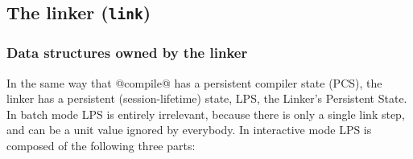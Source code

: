 \documentclass[11pt]{article}
\begin{document}
\subsection{The linker (\mbox{\tt link})}
\label{sec:linker}

\subsubsection{Data structures owned by the linker}

In the same way that @compile@ has a persistent compiler state (PCS),
the linker has a persistent (session-lifetime) state, LPS, the
Linker's Persistent State.  In batch mode LPS is entirely irrelevant,
because there is only a single link step, and can be a unit value
ignored by everybody.  In interactive mode LPS is composed of the
following three parts:
\end{document}
